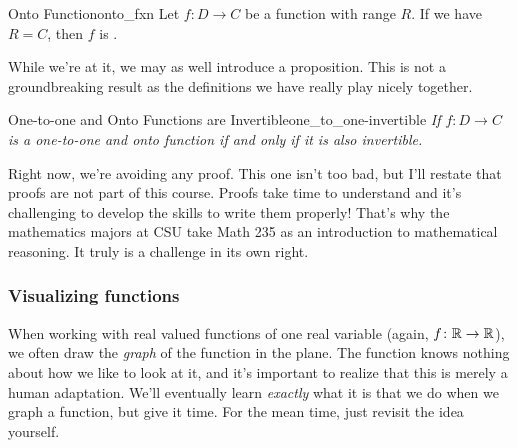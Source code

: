     \begin{df}{Onto Function}{onto_fxn}
    Let $f\colon D \to C$ be a function with range $R$. If we have $R=C$, then $f$ is .
    \end{df}
    
    While we're at it, we may as well introduce a proposition. This is not a groundbreaking result as the definitions we have really play nicely together. 
    
    \begin{prop}{One-to-one and Onto Functions are Invertible}{one_to_one-invertible}
    \textit{If $f\colon D \to C$ is a one-to-one and onto function if and only if it is also invertible.}
    
    \end{prop}
    Right now, we're avoiding any proof.  This one isn't too bad, but I'll restate that proofs are not part of this course. Proofs take time to understand and it's challenging to develop the skills to write them properly!  That's why the mathematics majors at CSU take Math 235 as an introduction to mathematical reasoning.  It truly is a challenge in its own right.
    
    
    \subsubsection{Visualizing functions}
    When working with real valued functions of one real variable (again, $f\colon \mathbb{R} \to \mathbb{R}$), we often draw the \emph{graph} of the function in the plane.  The function knows nothing about how we like to look at it, and it's important to realize that this is merely a human adaptation.  We'll eventually learn \emph{exactly} what it is that we do when we graph a function, but give it time.  For the mean time, just revisit the idea yourself.
    
